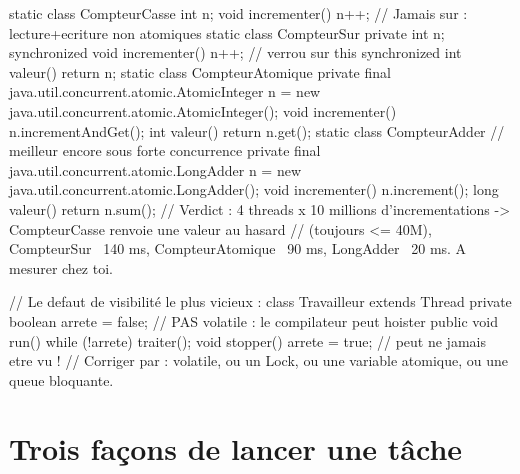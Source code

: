\begin{codejava}
static class CompteurCasse { int n; void incrementer() { n++; } }     // Jamais sur : lecture+ecriture non atomiques
static class CompteurSur {
    private int n;
    synchronized void incrementer() { n++; }                     // verrou sur this
    synchronized int valeur() { return n; }
}
static class CompteurAtomique {
    private final java.util.concurrent.atomic.AtomicInteger n = new java.util.concurrent.atomic.AtomicInteger();
    void incrementer() { n.incrementAndGet(); }
    int valeur() { return n.get(); }
}
static class CompteurAdder {                                      // meilleur encore sous forte concurrence
    private final java.util.concurrent.atomic.LongAdder n = new java.util.concurrent.atomic.LongAdder();
    void incrementer() { n.increment(); }
    long valeur() { return n.sum(); }
}
// Verdict : 4 threads x 10 millions d'incrementations -> CompteurCasse renvoie une valeur au hasard
// (toujours <= 40M), CompteurSur ~140 ms, CompteurAtomique ~90 ms, LongAdder ~20 ms. A mesurer chez toi.

// Le defaut de visibilit\'e le plus vicieux :
class Travailleur extends Thread {
    private boolean arrete = false;                       // PAS volatile : le compilateur peut hoister
    public void run() { while (!arrete) { traiter(); } }
    void stopper() { arrete = true; }                      // peut ne jamais etre vu !
}
// Corriger par : volatile, ou un Lock, ou une variable atomique, ou une queue bloquante.
\end{codejava}

\section{Trois fa\c{c}ons de lancer une t\^ache}

